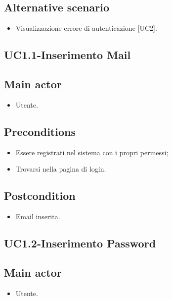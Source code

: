\documentclass{article}
\begin{document}
        \subsection*{Alternative scenario}
            \begin{itemize}
                \item Visualizzazione errore di autenticazione [UC2].
            \end{itemize}
            
\subsection{UC1.1-Inserimento Mail}
    
     \subsection*{Main actor}
         \begin{itemize}
             \item Utente.
         \end{itemize}
     \subsection*{Preconditions} 
        \begin{itemize}
            \item Essere registrati nel sistema con i propri permessi;
            \item Trovarsi nella pagina di login.
        \end{itemize}
        \subsection*{Postcondition} 
        \begin{itemize}
            \item Email inserita.
        \end{itemize}

\subsection{UC1.2-Inserimento Password}
    
     \subsection*{Main actor}
         \begin{itemize}
             \item Utente.
         \end{itemize}
\end{document}
